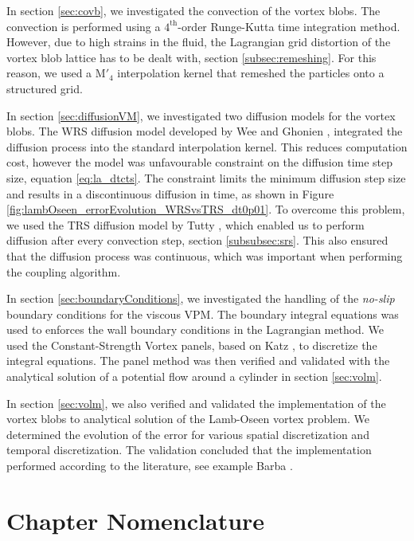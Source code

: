 In section \ref{sec:covb}, we investigated the convection of the vortex blobs. The convection is performed using a $4^{\mathrm{th}}$-order Runge-Kutta time integration method. However, due to high strains in the fluid, the Lagrangian grid distortion of the vortex blob lattice has to be dealt with, section \ref{subsec:remeshing}. For this reason, we used a $\mathrm{M}'_4$ interpolation kernel that remeshed the particles onto a structured grid.

In section \ref{sec:diffusionVM}, we investigated two diffusion models for the vortex blobs. The WRS diffusion model developed by Wee and Ghonien \cite{Wee2006a}, integrated the diffusion process into the standard interpolation kernel.  This reduces computation cost, however the model was unfavourable constraint on the diffusion time step size, equation 
\ref{eq:la_dtcts}. The constraint limits the minimum diffusion step size and results in a discontinuous diffusion in time, as shown in Figure \ref{fig:lambOseen_errorEvolution_WRSvsTRS_dt0p01}. To overcome this problem, we used the TRS diffusion model by Tutty \cite{Tutty2010a}, which enabled us to perform diffusion after every convection step, section
\ref{subsubsec:srs}. This also ensured that the diffusion process was continuous, which was important when performing the coupling algorithm.

In section \ref{sec:boundaryConditions}, we investigated the handling of the \emph{no-slip} boundary conditions for the viscous VPM. The boundary integral equations was used to enforces the wall boundary conditions in the Lagrangian method. We used the Constant-Strength Vortex panels, based on Katz \cite{Katz2001a}, to discretize the integral equations. The panel method was then verified and validated with the analytical solution of a potential flow around a cylinder in section \ref{sec:volm}. 

In section \ref{sec:volm}, we also verified and validated the implementation of the vortex blobs to analytical solution of the Lamb-Oseen vortex problem. We determined the evolution of the error for various spatial discretization and temporal discretization. The validation concluded that the implementation performed according to the literature, see example Barba \cite{Barba2004c}.



\section{Chapter Nomenclature}

